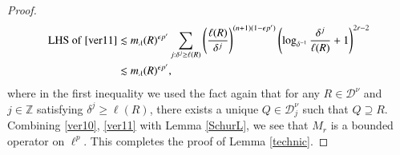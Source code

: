 \documentclass[12pt]{amsart}
\begin{document}
\begin{proof}
\begin{align*}
{\rm LHS}\ {\rm of}\ \eqref{ver11}%
&\lesssim m_\lambda(R)^{\epsilon p'}\sum_{j:\delta^j\geq \ell(R)}\left(\frac{\ell(R)}{\delta^j}\right)^{(n+1)(1-\epsilon p')}\left(\log_{\delta^{-1}}\frac{\delta^j}{\ell(R)}+1\right)^{2r-2}\\
&\lesssim m_\lambda(R)^{\epsilon p'},
\end{align*}
where in the first inequality we used the fact again that for any $R\in\mathcal{D}^\nu$ and $j\in\mathbb{Z}$ satisfying $\delta^j\geq \ell(R)$, there exists a unique $Q\in\mathcal{D}_j^\nu$ such that $Q\supseteq R$. Combining \eqref{ver10}, \eqref{ver11} with Lemma \ref{SchurL}, we see that $M_r$ is a bounded operator on $\ell^p$.
This completes the proof of Lemma \ref{technic}.
\end{proof}
\end{document}
